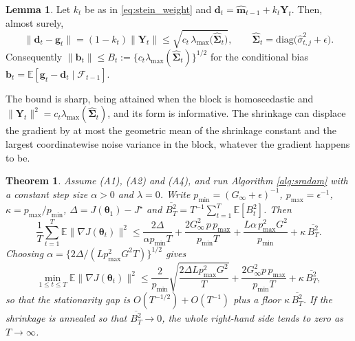 \documentclass[a4paper,fleqn]{cas-sc}
\theoremstyle{plain}
\newtheorem{theorem}{Theorem}
\theoremstyle{definition}
\newtheorem{lemma}{Lemma}
\theoremstyle{remark}
\newcommand{\diag}{\mathrm{diag}}
\newcommand{\E}{\mathbb{E}}
\begin{document}
\begin{lemma}
\label{lem:displacement}
Let $k_t$ be as in \eqref{eq:stein_weight} and $\bm d_t=\hat{\bm m}_{t-1}+k_t\bm Y_t$. Then, almost surely,
\begin{equation}
\label{eq:displacement}
\bigl\|\bm d_t-\bm g_t\bigr\|
=
(1-k_t)\|\bm Y_t\|
\le
\sqrt{c_t\,\lambda_{\max}\bigl(\widehat{\bm\Sigma}_t\bigr)},
\qquad
\widehat{\bm\Sigma}_t=\diag\bigl(\hat\sigma^2_{t,j}+\epsilon\bigr).
\end{equation}
Consequently $\|\bm b_t\|\le B_t:=\{c_t\lambda_{\max}(\widehat{\bm\Sigma}_t)\}^{1/2}$ for the conditional bias $\bm b_t=\E[\bm g_t-\bm d_t\mid\mathcal F_{t-1}]$.
\end{lemma}

The bound is sharp, being attained when the block is homoscedastic and $\|\bm Y_t\|^2=c_t\lambda_{\max}(\widehat{\bm\Sigma}_t)$, and its form is informative. The shrinkage can displace the gradient by at most the geometric mean of the shrinkage constant and the largest coordinatewise noise variance in the block, whatever the gradient happens to be.

\begin{theorem}
\label{thm:convergence}
Assume (A1), (A2) and (A4), and run Algorithm \ref{alg:sradam} with a constant step size $\alpha>0$ and $\lambda=0$. Write $p_{\min}=(G_\infty+\epsilon)^{-1}$, $p_{\max}=\epsilon^{-1}$, $\kappa=p_{\max}/p_{\min}$, $\Delta=J(\bm\theta_1)-J^\star$ and $\overline{B^2_T}=T^{-1}\sum_{t=1}^{T}\E[B^2_t]$. Then
\begin{equation}
\label{eq:conv_bound}
\frac1T\sum_{t=1}^{T}\E\bigl\|\nabla J(\bm\theta_t)\bigr\|^{2}
\le
\frac{2\Delta}{\alpha p_{\min}T}
+\frac{2G_\infty^{2}\,p\,p_{\max}}{p_{\min}T}
+\frac{L\alpha\,p^{2}_{\max}G^{2}}{p_{\min}}
+\kappa\,\overline{B^2_T} .
\end{equation}
Choosing $\alpha=\{2\Delta/(Lp^2_{\max}G^2T)\}^{1/2}$ gives
\begin{equation}
\label{eq:conv_rate}
\min_{1\le t\le T}\E\bigl\|\nabla J(\bm\theta_t)\bigr\|^{2}
\le
\frac{2}{p_{\min}}\sqrt{\frac{2\Delta L p^2_{\max}G^2}{T}}
+\frac{2G_\infty^{2}p\,p_{\max}}{p_{\min}T}
+\kappa\,\overline{B^2_T},
\end{equation}
so that the stationarity gap is $O(T^{-1/2})+O(T^{-1})$ plus a floor $\kappa\,\overline{B^2_T}$. If the shrinkage is annealed so that $\overline{B^2_T}\to0$, the whole right-hand side tends to zero as $T\to\infty$.
\end{theorem}
\end{document}
